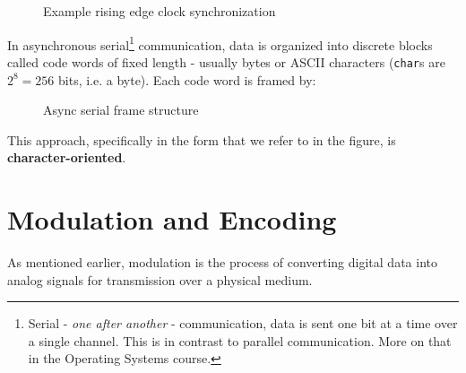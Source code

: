 \begin{figure}[h]
    \centering
    \caption{Example rising edge clock synchronization}\label{fig:clock_sync}
\end{figure}

\vfill
In asynchronous serial\footnote{
    Serial - \textit{one after another} - communication, data is sent one bit at a time over a single channel. This is in contrast to parallel communication. More on that in the Operating Systems course.
} communication, data is organized into discrete blocks called code words of fixed length - usually bytes or ASCII characters (\texttt{char}s are $2^8 = 256$ bits, i.e. a byte). Each code word is framed by:

\begin{figure}[h]
    \centering
    
    \caption{Async serial frame structure}\label{fig:async_frame}
\end{figure}

This approach, specifically in the form that we refer to in the figure, is \textbf{character-oriented}.
\vfill
\section{Modulation and Encoding}\label{sec:modulation}
As mentioned earlier, modulation is the process of converting digital data into analog signals for transmission over a physical medium.

